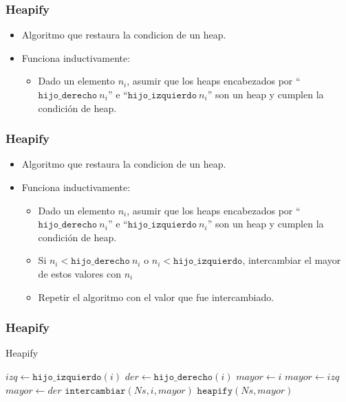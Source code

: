 \documentclass{beamer}
\begin{document}
\begin{frame}
    \frametitle{Heapify}
    \begin{itemize}
        \item{Algoritmo que restaura la condicion de un heap.}
        \item{Funciona inductivamente:
        \begin{itemize}
            \item{Dado un elemento $n_i$, asumir que los heaps
            encabezados por ``$\mathtt{hijo\_derecho}\ n_i$'' e ``$\mathtt{hijo\_izquierdo}\ n_i$''
            son un heap y cumplen la condici\'on de heap.}
        \end{itemize}}
    \end{itemize}
\end{frame}

\begin{frame}
    \frametitle{Heapify}
    \begin{itemize}
        \item{Algoritmo que restaura la condicion de un heap.}
        \item{Funciona inductivamente:
        \begin{itemize}
            \item{Dado un elemento $n_i$, asumir que los heaps
            encabezados por ``$\mathtt{hijo\_derecho}\ n_i$'' e ``$\mathtt{hijo\_izquierdo}\ n_i$''
            son un heap y cumplen la condici\'on de heap.}
            \item{Si $n_i < \mathtt{hijo\_derecho}\ n_i$ o $n_i < \mathtt{hijo\_izquierdo}$,
            intercambiar el mayor de estos valores con $n_i$}
            \item{Repetir el algoritmo con el valor que fue intercambiado.}
        \end{itemize}}
    \end{itemize}
\end{frame}

\begin{frame}

    \frametitle{Heapify}

    \begin{algorithm}[H]
        \caption{Heapify}
        \begin{algorithmic}[1]
        \State $izq\gets\mathtt{hijo\_izquierdo}(i)$
        \State $der\gets\mathtt{hijo\_derecho}(i)$
        \State $mayor\gets i$
            \State $mayor\gets izq$
        \EndIf
            \State $mayor\gets der$
        \EndIf
            \State $\mathtt{intercambiar}(Ns,i,mayor)$
            \State $\mathtt{heapify}(Ns, mayor)$
        \EndIf
        \EndProcedure
        \end{algorithmic}
    \end{algorithm}
    
\end{frame}
\end{document}
